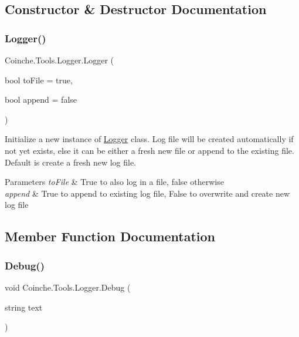 \subsection{Constructor \& Destructor Documentation}
\mbox{\label{class_coinche_1_1_tools_1_1_logger_a2e3e986856697b6a0bd807e2ad491ecd}} 
\subsubsection{\texorpdfstring{Logger()}{Logger()}}
{\footnotesize\ttfamily Coinche.\+Tools.\+Logger.\+Logger (\begin{DoxyParamCaption}\item[{bool}]{to\+File = {\ttfamily true},  }\item[{bool}]{append = {\ttfamily false} }\end{DoxyParamCaption})\hspace{0.3cm}{\ttfamily [inline]}}



Initialize a new instance of \hyperlink{class_coinche_1_1_tools_1_1_logger}{Logger} class. Log file will be created automatically if not yet exists, else it can be either a fresh new file or append to the existing file. Default is create a fresh new log file. 


\begin{DoxyParams}{Parameters}
{\em to\+File} & True to also log in a file, false otherwise\\
\hline
{\em append} & True to append to existing log file, False to overwrite and create new log file\\
\hline
\end{DoxyParams}


\subsection{Member Function Documentation}
\mbox{\label{class_coinche_1_1_tools_1_1_logger_a5e58c9a36a174cb4288591e7e94edf62}} 
\subsubsection{\texorpdfstring{Debug()}{Debug()}}
{\footnotesize\ttfamily void Coinche.\+Tools.\+Logger.\+Debug (\begin{DoxyParamCaption}\item[{string}]{text }\end{DoxyParamCaption})\hspace{0.3cm}{\ttfamily [inline]}}



